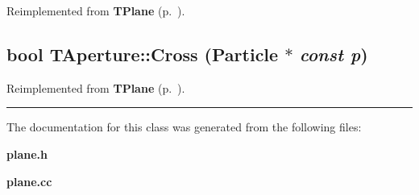 Reimplemented from {\bf TPlane} {\rm (p.~\pageref{TPlane_a2})}.\label{TAperture_a2}
\subsection{\setlength{\rightskip}{0pt plus 5cm}bool TAperture::Cross ({\bf Particle} $\ast$ {\em const p})\hspace{0.3cm}{\tt  [virtual]}}



Reimplemented from {\bf TPlane} {\rm (p.~\pageref{TPlane_a4})}.\vspace{0.4cm}\hrule\vspace{0.2cm}
The documentation for this class was generated from the following files:\begin{CompactItemize}
\item 
{\bf plane.h}\item 
{\bf plane.cc}\end{CompactItemize}
